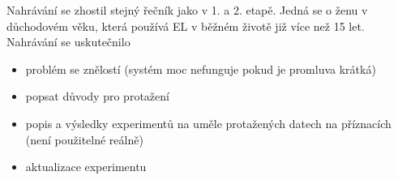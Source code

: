 Nahrávání se zhostil stejný řečník jako v 1. a 2. etapě. Jedná se o ženu v důchodovém věku, která používá EL v běžném životě již více než 15 let. Nahrávání se uskutečnilo

\begin{itemize}
  \item problém se znělostí (systém moc nefunguje pokud je promluva krátká)
  \item popsat důvody pro protažení
  \item popis a výsledky experimentů na uměle protažených datech na příznacích (není použitelné reálně)
  \item aktualizace experimentu 
\end{itemize}
